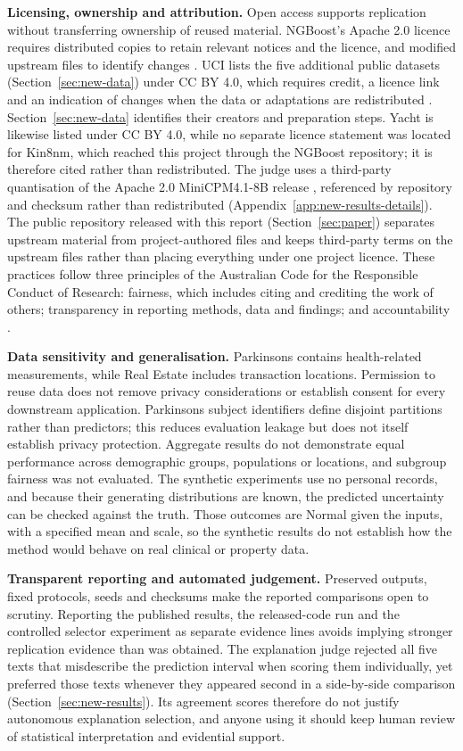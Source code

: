 \textbf{Licensing, ownership and attribution.}
Open access supports replication without transferring ownership of reused material.
NGBoost's Apache 2.0 licence requires distributed copies to retain relevant notices and the licence, and modified upstream files to identify changes \cite{ngboostrepo}.
UCI lists the five additional public datasets (Section~\ref{sec:new-data}) under CC BY 4.0, which requires credit, a licence link and an indication of changes when the data or adaptations are redistributed \cite{creativecommons4}.
Section~\ref{sec:new-data} identifies their creators and preparation steps.
Yacht is likewise listed under CC BY 4.0, while no separate licence statement was located for Kin8nm, which reached this project through the NGBoost repository; it is therefore cited rather than redistributed.
The judge uses a third-party quantisation of the Apache 2.0 MiniCPM4.1-8B release \cite{openbmb2025minicpm41}, referenced by repository and checksum rather than redistributed (Appendix~\ref{app:new-results-details}).
The public repository released with this report (Section~\ref{sec:paper}) separates upstream material from project-authored files and keeps third-party terms on the upstream files rather than placing everything under one project licence.
These practices follow three principles of the Australian Code for the Responsible Conduct of Research: fairness, which includes citing and crediting the work of others; transparency in reporting methods, data and findings; and accountability \cite{australiancode2018}.

\textbf{Data sensitivity and generalisation.}
Parkinsons contains health-related measurements, while Real Estate includes transaction locations.
Permission to reuse data does not remove privacy considerations or establish consent for every downstream application.
Parkinsons subject identifiers define disjoint partitions rather than predictors; this reduces evaluation leakage but does not itself establish privacy protection.
Aggregate results do not demonstrate equal performance across demographic groups, populations or locations, and subgroup fairness was not evaluated.
The synthetic experiments use no personal records, and because their generating distributions are known, the predicted uncertainty can be checked against the truth.
Those outcomes are Normal given the inputs, with a specified mean and scale, so the synthetic results do not establish how the method would behave on real clinical or property data.

\textbf{Transparent reporting and automated judgement.}
Preserved outputs, fixed protocols, seeds and checksums make the reported comparisons open to scrutiny.
Reporting the published results, the released-code run and the controlled selector experiment as separate evidence lines avoids implying stronger replication evidence than was obtained.
The explanation judge rejected all five texts that misdescribe the prediction interval when scoring them individually, yet preferred those texts whenever they appeared second in a side-by-side comparison (Section~\ref{sec:new-results}).
Its agreement scores therefore do not justify autonomous explanation selection, and anyone using it should keep human review of statistical interpretation and evidential support.
